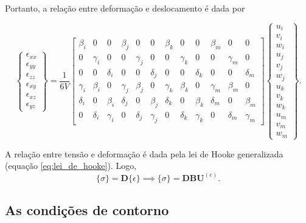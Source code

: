 Portanto, a relação entre deformação e deslocamento é dada por

\begin{equation}
    \begin{Bmatrix}
        \epsilon_{xx} \\ \epsilon_{yy} \\ \epsilon_{zz} \\ \epsilon_{xy} \\ \epsilon_{xz} \\ \epsilon_{yz}
    \end{Bmatrix} = \frac{1}{6V} 
    \begin{bmatrix}
\beta_i & 0 & 0 & \beta_j & 0 & 0 & \beta_k & 0 & 0 & \beta_m & 0 & 0 \\
0 & \gamma_i & 0 & 0 & \gamma_j & 0 & 0 & \gamma_k & 0 & 0 & \gamma_m & 0 \\
0 & 0 & \delta_i & 0 & 0 & \delta_j & 0 & 0 & \delta_k & 0 & 0 & \delta_m \\
\gamma_i & \beta_i & 0 & \gamma_j & \beta_j & 0 & \gamma_k & \beta_k & 0 & \gamma_m & \beta_m & 0 \\
\delta_i & 0 & \beta_i & \delta_j & 0 & \beta_j & \delta_k & 0 & \beta_k & \delta_m & 0 & \beta_m \\
0 & \delta_i & \gamma_i & 0 & \delta_j & \gamma_j & 0 & \delta_k & \gamma_k & 0 & \delta_m & \gamma_m
    \end{bmatrix} 
    \begin{Bmatrix}
        u_i \\ v_i \\ w_i \\ u_j \\ v_j \\ w_j \\ u_k \\ v_k \\ w_k \\ u_m \\ v_m \\ w_m
    \end{Bmatrix}.
\end{equation}

A relação entre tensão e deformação é dada pela lei de Hooke generalizada (equação \ref{eq:lei_de_hooke}). Logo,
\begin{equation}
    \{\sigma\} = \bm{D} \{\epsilon\} \implies \{\sigma\} = \bm{D} \bm{B} \bm{U}^{(e)}.
\end{equation}

\subsection{As condições de contorno}

